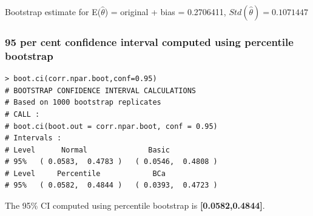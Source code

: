 \documentclass[12pt,letterpaper,titlepage,en-US]{article}
\begin{document}
Bootstrap estimate for E($\hat{\theta}$) = original + bias = 0.2706411,
$Std(\hat{\theta}) = 0.1071447
$


\subsubsection{95 per cent confidence interval computed using percentile bootstrap}

\begin{knitrout}
\color{fgcolor}
\begin{kframe}
\begin{verbatim}
> boot.ci(corr.npar.boot,conf=0.95)
# BOOTSTRAP CONFIDENCE INTERVAL CALCULATIONS
# Based on 1000 bootstrap replicates
# CALL : 
# boot.ci(boot.out = corr.npar.boot, conf = 0.95)
# Intervals : 
# Level      Normal              Basic         
# 95%   ( 0.0583,  0.4783 )   ( 0.0546,  0.4808 )  
# Level     Percentile            BCa          
# 95%   ( 0.0582,  0.4844 )   ( 0.0393,  0.4723 ) 
\end{verbatim}
\end{kframe}
\end{knitrout}
The 95\% CI computed using percentile bootstrap is \textbf{[0.0582,0.4844]}.\\
\end{document}
